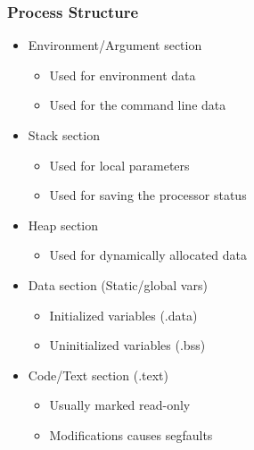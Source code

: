 \documentclass[12pt]{beamer}
\begin{document}
	\begin{frame}
		\frametitle{Process Structure}
		\begin{itemize}
			\small
			\item Environment/Argument section
			\begin{itemize}
				\item Used for environment data
				\item Used for the command line data
			\end{itemize}
			\item Stack section
			\begin{itemize}
				\item Used for local parameters
				\item Used for saving the processor status
			\end{itemize}
			\item Heap section
			\begin{itemize}
				\item Used for dynamically allocated data
			\end{itemize}
			\item Data section (Static/global vars)
			\begin{itemize}
				\item Initialized variables (.data)
				\item Uninitialized variables (.bss)
			\end{itemize}
			\item Code/Text section (.text)
			\begin{itemize}
				\item Usually marked read-only
				\item Modifications causes segfaults
			\end{itemize}
		\end{itemize}
	\end{frame}		
	
\end{document}
